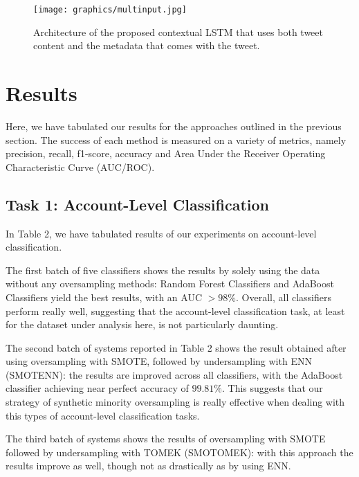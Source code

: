 \begin{figure}
\begin{center}
\texttt{[image: graphics/multinput.jpg]} 
\caption{Architecture of the proposed contextual LSTM that uses both tweet content and the metadata that comes with the tweet.}
\end{center}\vspace*{-.6cm}
\end{figure}

\section{Results}

Here, we have tabulated our results for the approaches outlined in the previous section. The success of each method is measured on a variety of metrics, namely precision, recall, f1-score, accuracy and Area Under the Receiver Operating Characteristic Curve (AUC/ROC).

\subsection{Task 1: Account-Level Classification}

In Table 2, we have tabulated results of our experiments on account-level classification. 

The first batch of five classifiers shows the results by solely using the data without any oversampling methods: Random Forest Classifiers and AdaBoost Classifiers yield the best results, with an AUC $> 98\%$. Overall, all classifiers perform really well, suggesting that the account-level classification task, at least for the dataset under analysis here, is not particularly daunting. \par 

The second batch of systems reported in Table 2 shows the result obtained after using  oversampling with SMOTE, followed by undersampling with ENN (SMOTENN): the results are improved across all classifiers, with the AdaBoost classifier achieving near perfect accuracy of $99.81\%$. This suggests that our strategy of synthetic minority oversampling is really effective when dealing with this types of account-level classification tasks. 

The third batch of systems shows the results of oversampling with SMOTE followed by undersampling with TOMEK (SMOTOMEK): with this approach  the results improve as well, though not as drastically as by using ENN. \par 

